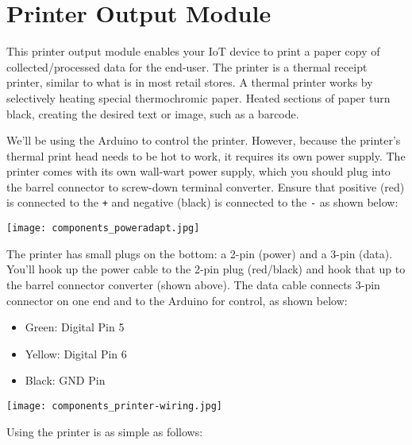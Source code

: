 
\clearpage
\section{Printer Output Module}
\label{sec-output-printer}

This printer output module enables your IoT device to print a paper copy
of collected/processed data for the end-user. The printer is a thermal
receipt printer, similar to what is in most retail stores. A thermal
printer works by selectively heating special thermochromic paper. Heated
sections of paper turn black, creating the desired text or image, such as
a barcode.

We'll be using the Arduino to control the printer. However, because the
printer's thermal print head needs to be hot to work, it requires its own
power supply. The printer comes with its own wall-wart power supply,
which you should plug into the barrel connector to screw-down terminal
converter. Ensure that positive (red) is connected to the \texttt{+} and
negative (black) is connected to the \texttt{-} as shown below:

\begin{center}
\texttt{[image: components\_poweradapt.jpg]}
\end{center}

The printer has small plugs on the bottom: a 2-pin (power) and a 3-pin
(data). You'll hook up the power cable to the 2-pin plug (red/black) and
hook that up to the barrel connector converter (shown above). The data
cable connects 3-pin connector on one end and to the Arduino for control,
as shown below:

\begin{itemize}
\item Green: Digital Pin 5
\item Yellow: Digital Pin 6
\item Black: GND Pin
\end{itemize}

\begin{center}
\texttt{[image: components\_printer-wiring.jpg]}
\end{center}

\newpage

Using the printer is as simple as follows:

